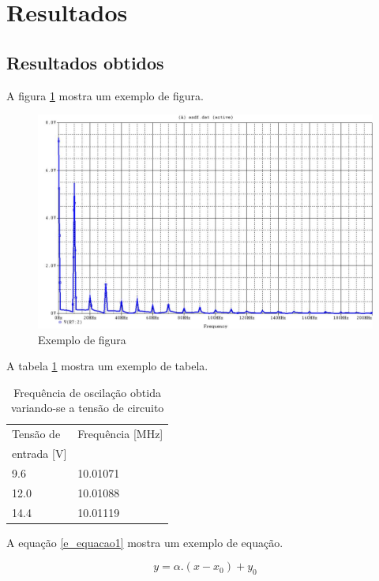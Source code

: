 \newpage
\section{Resultados}

\subsection{Resultados obtidos}

A figura \ref{f_img1} mostra um exemplo de figura.

\begin{figure}[H]
	\centering
	\includegraphics[scale=0.3]{img/img1.jpg}
	\caption{Exemplo de figura}
	\label{f_img1}
\end{figure}

A tabela \ref{t_tabela1} mostra um exemplo de tabela.

\begin{small}
	\begin{table}[H]
		\begin{center}
			\caption{Frequência de oscilação obtida variando-se a tensão de circuito}
			\begin{tabular}{l|l}
				\hline
				Tensão de & Frequência [MHz] \\
				entrada [V]&  \\
				\hline
				9.6 & 10.01071 \\
				\hline
				12.0 & 10.01088 \\
				\hline
				14.4 & 10.01119 \\
				\hline
			\end{tabular}
			\label{t_tabela1}
		\end{center}
	\end{table}
\end{small}

A equação \ref{e_equacao1} mostra um exemplo de equação.

\begin{equation}
y = \alpha.(x-x_0) + y_0
\label{e_equacao1}
\end{equation}